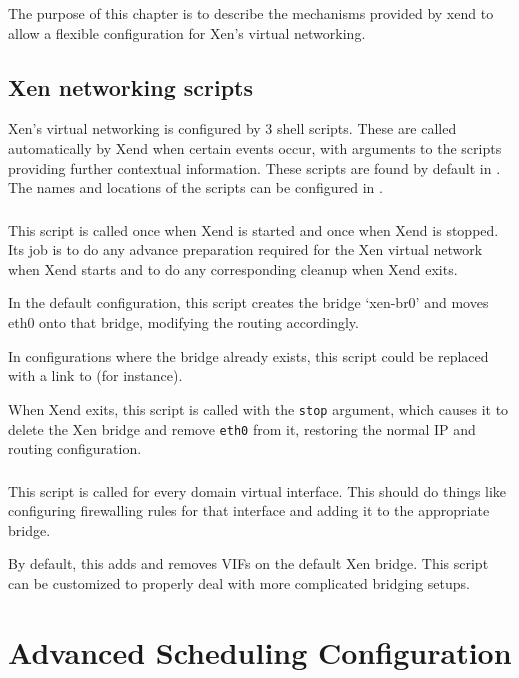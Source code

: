 \documentclass[11pt,twoside,final,openright]{xenstyle}
\begin{document}
{The purpose of this chapter is to describe the mechanisms provided by
xend to allow a flexible configuration for Xen's virtual networking.

\section{Xen networking scripts}

Xen's virtual networking is configured by 3 shell scripts.  These are
called automatically by Xend when certain events occur, with arguments
to the scripts providing further contextual information.  These
scripts are found by default in .  The names and
locations of the scripts can be configured in .

\subsection{}

This script is called once when Xend is started and once when Xend is
stopped.  Its job is to do any advance preparation required for the
Xen virtual network when Xend starts and to do any corresponding
cleanup when Xend exits.

In the default configuration, this script creates the bridge
`xen-br0' and moves eth0 onto that bridge, modifying the routing
accordingly.

In configurations where the bridge already exists, this script could
be replaced with a link to  (for instance).

When Xend exits, this script is called with the {\tt stop} argument,
which causes it to delete the Xen bridge and remove {\tt eth0} from
it, restoring the normal IP and routing configuration.

\subsection{}

This script is called for every domain virtual interface.  This should
do things like configuring firewalling rules for that interface and
adding it to the appropriate bridge.

By default, this adds and removes VIFs on the default Xen bridge.
This script can be customized to properly deal with more complicated
bridging setups.

\chapter{Advanced Scheduling Configuration}

}
\end{document}
